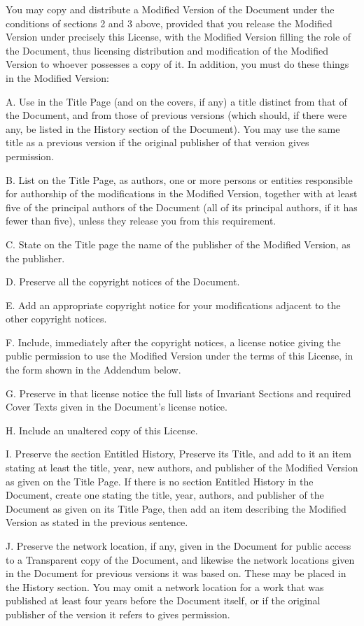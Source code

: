 \documentclass[captions=tableheading]{scrbook}
\begin{document}
You may copy and distribute a Modified Version of the Document under the conditions of sections 2 and 3 above, provided that you release the Modified Version under precisely this License, with the Modified Version filling the role of the Document, thus licensing distribution and modification of the Modified Version to whoever possesses a copy of it. In addition, you must do these things in the Modified Version:

A. Use in the Title Page (and on the covers, if any) a title distinct from that of the Document, and from those of previous versions (which should, if there were any, be listed in the History section of the Document). You may use the same title as a previous version if the original publisher of that version gives permission. 

B. List on the Title Page, as authors, one or more persons or entities responsible for authorship of the modifications in the Modified Version, together with at least five of the principal authors of the Document (all of its principal authors, if it has fewer than five), unless they release you from this requirement. 

C. State on the Title page the name of the publisher of the Modified Version, as the publisher. 

D. Preserve all the copyright notices of the Document. 

E. Add an appropriate copyright notice for your modifications adjacent to the other copyright notices. 

F. Include, immediately after the copyright notices, a license notice giving the public permission to use the Modified Version under the terms of this License, in the form shown in the Addendum below.  

G. Preserve in that license notice the full lists of Invariant Sections and required Cover Texts given in the Document's license notice. 

H. Include an unaltered copy of this License. 

I. Preserve the section Entitled History, Preserve its Title, and add to it an item stating at least the title, year, new authors, and publisher of the Modified Version as given on the Title Page. If there is no section Entitled History in the Document, create one stating the title, year, authors, and publisher of the Document as given on its Title Page, then add an item describing the Modified Version as stated in the previous sentence. 

J. Preserve the network location, if any, given in the Document for public access to a Transparent copy of the Document, and likewise the network locations given in the Document for previous versions it was based on. These may be placed in the History section. You may omit a network location for a work that was published at least four years before the Document itself, or if the original publisher of the version it refers to gives permission. 
\end{document}
